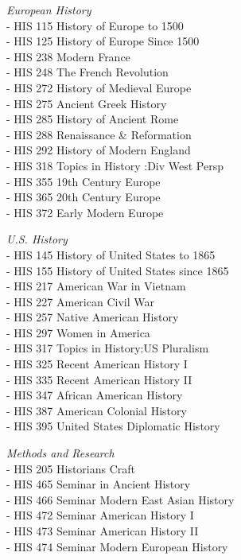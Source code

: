 \documentclass[
  letterpaper,
]{scrbook}
\begin{document}
\emph{European History}\\
- HIS 115 History of Europe to 1500\\
- HIS 125 History of Europe Since 1500\\
- HIS 238 Modern France\\
- HIS 248 The French Revolution\\
- HIS 272 History of Medieval Europe\\
- HIS 275 Ancient Greek History\\
- HIS 285 History of Ancient Rome\\
- HIS 288 Renaissance \& Reformation\\
- HIS 292 History of Modern England\\
- HIS 318 Topics in History :Div West Persp\\
- HIS 355 19th Century Europe\\
- HIS 365 20th Century Europe\\
- HIS 372 Early Modern Europe

\emph{U.S. History}\\
- HIS 145 History of United States to 1865\\
- HIS 155 History of United States since 1865\\
- HIS 217 American War in Vietnam\\
- HIS 227 American Civil War\\
- HIS 257 Native American History\\
- HIS 297 Women in America\\
- HIS 317 Topics in History:US Pluralism\\
- HIS 325 Recent American History I\\
- HIS 335 Recent American History II\\
- HIS 347 African American History\\
- HIS 387 American Colonial History\\
- HIS 395 United States Diplomatic History

\emph{Methods and Research}\\
- HIS 205 Historians Craft\\
- HIS 465 Seminar in Ancient History\\
- HIS 466 Seminar Modern East Asian History\\
- HIS 472 Seminar American History I\\
- HIS 473 Seminar American History II\\
- HIS 474 Seminar Modern European History
\end{document}

